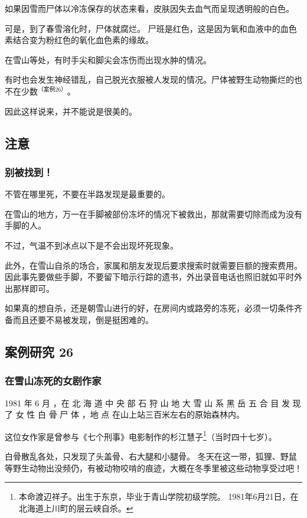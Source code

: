 \documentclass[UTF8]{ctexart}
\begin{document}
如果因雪而尸体以冷冻保存的状态来看，皮肤因失去血气而呈现透明般的白色。

可是，到了春雪溶化时，尸体就腐烂。
尸班是红色，这是因为氧和血液中的血色素结合变为粉红色的氧化血色素的缘故。

在雪山等处，有时手尖和脚尖会冻伤而出现水肿的情况。

有时也会发生神经错乱，自己脱光衣服被人发现的情况。尸体被野生动物撕烂的也不在少数$^{（案例 26）}$。

因此这样说来，并不能说是很美的。

\subsection{注意}

\subsubsection*{别被找到！}

不管在哪里死，不要在半路发现是最重要的。

在雪山的地方，万一在手脚被部份冻坏的情况下被救出，那就需要切除而成为没有手脚的人。

不过，气温不到冰点以下是不会出现坏死现象。

此外，在雪山自杀的场合，家属和朋友发现后要求搜索时就需要巨额的搜索费用。因此事先要做些手脚，不要留下暗示行踪的遗书，外出录音电话也照旧就如平时外出那样即可。

如果真的想自杀，还是朝雪山进行的好，在房间内或路旁的冻死，必须一切条件齐备而且还要不易被发现，倒是挺困难的。

\subsection{案例研究 26}

\subsubsection*{在雪山冻死的女剧作家}

1981 年 6 月 ，在 北 海 道 中 央 部 石 狩 山 地 大 雪 山 系 黑 岳 五 合 目 发 现 了 女 性 白 骨 尸 体 ，地 点 在山上站三百米左右的原始森林内。

这位女作家是曾参与《七个刑事》电影制作的杉江慧子\footnote{本命渡辺祥子。出生于东京，毕业于青山学院初级学院。 1981年6月21日，在北海道上川町的层云峡自杀。}（当时四十七岁）。

白骨散乱各处，只发现了头盖骨、右大腿和小腿骨。
冬天在这一带，狐狸、野鼠等野生动物出没频仍，有被动物咬啃的痕迹，大概在冬季里被这些动物享受过吧！
\end{document}
